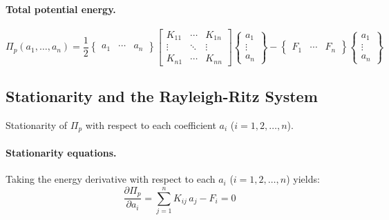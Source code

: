\documentclass[11pt, a4paper]{article}
\begin{document}
\paragraph{Total potential energy.}
\begin{equation}\label{eq:pi_gen}
\Pi_p(a_1, \dots, a_n)
= \frac{1}{2}
\begin{Bmatrix}a_1 & \cdots & a_n\end{Bmatrix}
\begin{bmatrix}
K_{11} & \cdots & K_{1n}\\
\vdots & \ddots & \vdots\\
K_{n1} & \cdots & K_{nn}
\end{bmatrix}
\begin{Bmatrix}a_1 \\ \vdots \\ a_n\end{Bmatrix}
-
\begin{Bmatrix}F_1 & \cdots & F_n\end{Bmatrix}
\begin{Bmatrix}a_1 \\ \vdots \\ a_n\end{Bmatrix}
\end{equation}

\subsection{Stationarity and the Rayleigh-Ritz System}

Stationarity of $\Pi_p$ with respect to each coefficient $a_i$
($i=1,2,\dots,n$).

\paragraph{Stationarity equations.}
Taking the energy derivative with respect to each $a_i$ ($i=1,2,\dots,n$) yields:
\begin{equation}
\frac{\partial\Pi_p}{\partial a_i}
= \sum_{j=1}^n K_{ij}\,a_j - F_i = 0
\label{eq:stationarity_gen}
\end{equation}
\end{document}
